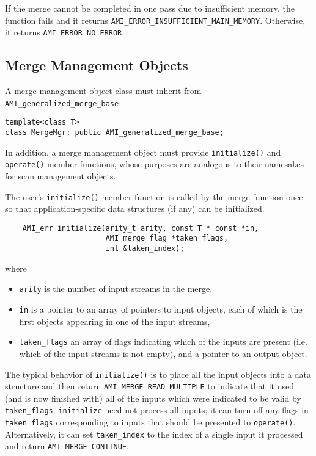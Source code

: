 If the merge cannot be completed in one pass due to insufficient
memory, the function fails and it returns
\lstinline|AMI_ERROR_INSUFFICIENT_MAIN_MEMORY|. Otherwise, it returns
\lstinline|AMI_ERROR_NO_ERROR|.



\subsection{Merge Management Objects}\label{ssec:mmo}

A merge management object class must inherit from
\lstinline|AMI_generalized_merge_base|:
\begin{lstlisting}
template<class T>
class MergeMgr: public AMI_generalized_merge_base;
\end{lstlisting}
In addition, 
a merge management object must provide \lstinline|initialize()|
and \lstinline|operate()| member functions, whose purposes are
analogous to their namesakes for scan management objects.

    The user's \lstinline|initialize()| member function is
    called by the merge function once so that
    application-specific data structures (if any) can be
    initialized.
\begin{lstlisting}
    AMI_err initialize(arity_t arity, const T * const *in,
                       AMI_merge_flag *taken_flags,
                       int &taken_index);
\end{lstlisting}
 
    where
    \begin{itemize}
        \item \lstinline|arity| is the number of input streams
        in the merge,
        \item \lstinline|in| is a pointer to an array of
        pointers to input objects, each of which is the
        first objects appearing in one of the input streams,    
        \item \lstinline|taken_flags| an array of flags
        indicating which of the inputs are present (i.e.
        which of the input streams is not empty), and a
        pointer to an output object.
    \end{itemize}
    
    The typical behavior of \lstinline|initialize()| is to
    place all the input objects into a data structure and
    then return \lstinline|AMI_MERGE_READ_MULTIPLE| to
    indicate that it used (and is now finished with) all of
    the inputs which were indicated to be valid by
    \lstinline|taken_flags|.  \lstinline|initialize| need not
    process all inputs; it can turn off any flags in
    \lstinline|taken_flags| corresponding to inputs that
    should be presented to \lstinline|operate()|.
    Alternatively, it can set \lstinline|taken_index| to the
    index of a single input it processed and return
    \lstinline|AMI_MERGE_CONTINUE|.

